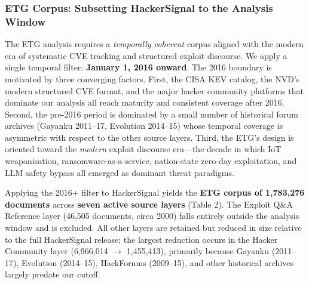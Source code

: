 \documentclass[12pt]{article}
\begin{document}
\subsubsection{ETG Corpus: Subsetting HackerSignal to the Analysis Window}

The ETG analysis requires a \textit{temporally coherent} corpus aligned with the modern era of systematic CVE tracking and structured exploit discourse. We apply a single temporal filter: \textbf{January 1, 2016 onward}. The 2016 boundary is motivated by three converging factors. First, the CISA KEV catalog, the NVD's modern structured CVE format, and the major hacker community platforms that dominate our analysis all reach maturity and consistent coverage after 2016. Second, the pre-2016 period is dominated by a small number of historical forum archives (Gayanku 2011--17, Evolution 2014--15) whose temporal coverage is asymmetric with respect to the other source layers. Third, the ETG's design is oriented toward the \textit{modern} exploit discourse era---the decade in which IoT weaponisation, ransomware-as-a-service, nation-state zero-day exploitation, and LLM safety bypass all emerged as dominant threat paradigms.

Applying the 2016+ filter to HackerSignal yields the \textbf{ETG corpus of 1,783,276 documents} across \textbf{seven active source layers} (Table 2). The Exploit Q\&A Reference layer (46,505 documents, circa 2000) falls entirely outside the analysis window and is excluded. All other layers are retained but reduced in size relative to the full HackerSignal release; the largest reduction occurs in the Hacker Community layer (6,966,014 $\rightarrow$ 1,455,413), primarily because Gayanku (2011--17), Evolution (2014--15), HackForums (2009--15), and other historical archives largely predate our cutoff.
\end{document}
